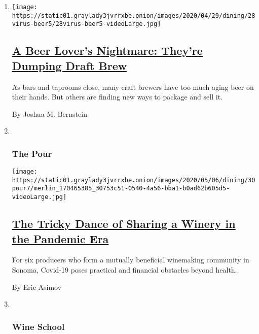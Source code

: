 \begin{enumerate}
\def\labelenumi{\arabic{enumi}.}
\item
  \texttt{[image: https://static01.graylady3jvrrxbe.onion/images/2020/04/29/dining/28virus-beer5/28virus-beer5-videoLarge.jpg]}

  \hypertarget{a-beer-lovers-nightmare-theyre-dumping-draft-brew}{%
  \subsection{\texorpdfstring{\href{/2020/04/28/dining/drinks/craft-beer-coronavirus.html}{A
  Beer Lover's Nightmare: They're Dumping Draft
  Brew}}{A Beer Lover's Nightmare: They're Dumping Draft Brew}}\label{a-beer-lovers-nightmare-theyre-dumping-draft-brew}}

  As bars and taprooms close, many craft brewers have too much aging
  beer on their hands. But others are finding new ways to package and
  sell it.

  By Joshua M. Bernstein
\item ~
  \hypertarget{the-pour-1}{%
  \subsubsection{The Pour}\label{the-pour-1}}

  \texttt{[image: https://static01.graylady3jvrrxbe.onion/images/2020/05/06/dining/30pour7/merlin\_170465385\_30753c51-0540-4a56-bba1-b0ad62b605d5-videoLarge.jpg]}

  \hypertarget{the-tricky-dance-of-sharing-a-winery-in-the-pandemic-era}{%
  \subsection{\texorpdfstring{\href{/2020/04/30/dining/drinks/pax-mahle-wine-coronavirus.html}{The
  Tricky Dance of Sharing a Winery in the Pandemic
  Era}}{The Tricky Dance of Sharing a Winery in the Pandemic Era}}\label{the-tricky-dance-of-sharing-a-winery-in-the-pandemic-era}}

  For six producers who form a mutually beneficial winemaking community
  in Sonoma, Covid-19 poses practical and financial obstacles beyond
  health.

  By Eric Asimov
\item ~
  \hypertarget{wine-school-1}{%
  \subsubsection{Wine School}\label{wine-school-1}}


\end{enumerate}
